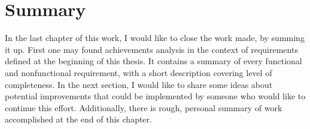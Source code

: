 %


\chapter{Summary}
\label{cha:summary}

\parbox{0.8\textwidth}{

{\small
In the last chapter of this work, I would like to close the work made, by summing it up. First one may found achievements analysis in the context of requirements defined at the beginning of this thesis. It contains a summary of every functional and nonfunctional requirement, with a short description covering level of completeness. In the next section, I would like to share some ideas about potential improvements that could be implemented by someone who would like to continue this effort. Additionally, there is rough, personal summary of work accomplished at the end of this chapter.
}
}














